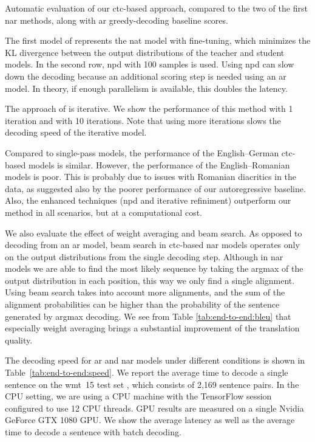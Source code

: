 \begin{table}
  \caption{Automatic evaluation of our \acs{ctc}-based approach, compared to
    the two of the first \acl{nar} methods, along with \acl{ar} greedy-decoding
    baseline scores. }%
  \label{tab:end-to-end:bleu}
\end{table}

The first model of \citet{gu2017nonautoregressive} represents the \ac{nat}
model with fine-tuning, which minimizes the KL divergence between the output
distributions of the teacher and student models. In the second row, \ac{npd}
with 100 samples is used. Using \ac{npd} can slow down the decoding because an
additional scoring step is needed using an \ac{ar} model. In theory, if enough
parallelism is available, this doubles the latency.

The approach of \citet{lee-etal-2018-deterministic} is iterative. We show the
performance of this method with 1 iteration and with 10 iterations. Note that
using more iterations slows the decoding speed of the iterative model.

Compared to single-pass models, the performance of the English--German
\acs{ctc}-based models is similar. However, the performance of the
English--Romanian models is poor. This is probably due to issues with Romanian
diacritics in the data, as suggested also by the poorer performance of our
autoregressive baseline. Also, the enhanced techniques (\ac{npd} and iterative
refiniment) outperform our method in all scenarios, but at a computational
cost.

We also evaluate the effect of weight averaging and beam search. As opposed to
decoding from an \ac{ar} model, beam search in \acs{ctc}-based \ac{nar} models
operates only on the output distributions from the single decoding
step. Although in \ac{nar} models we are able to find the most likely sequence
by taking the argmax of the output distribution in each position, this way we
only find a single alignment. Using beam search takes into account more
alignments, and the sum of the alignment probabilities can be higher than the
probability of the sentence generated by argmax decoding. We see from Table
\ref{tab:end-to-end:bleu} that especially weight averaging brings a substantial
improvement of the translation quality.

The decoding speed for \ac{ar} and \ac{nar} models under different conditions
is shown in Table~\ref{tab:end-to-end:speed}. We report the average time to
decode a single sentence on the \ac{wmt}~15 test set
\citep{bojar-etal-2015-findings}, which consists of 2,169 sentence pairs. In
the CPU setting, we are using a CPU machine with the TensorFlow session
configured to use 12 CPU threads. GPU results are measured on a single Nvidia
GeForce GTX 1080 GPU. We show the average latency as well as the average time
to decode a sentence with batch decoding.

